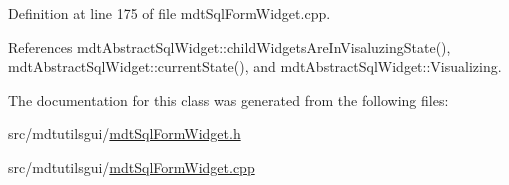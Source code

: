 Definition at line 175 of file mdt\-Sql\-Form\-Widget.\-cpp.



References mdt\-Abstract\-Sql\-Widget\-::child\-Widgets\-Are\-In\-Visaluzing\-State(), mdt\-Abstract\-Sql\-Widget\-::current\-State(), and mdt\-Abstract\-Sql\-Widget\-::\-Visualizing.



The documentation for this class was generated from the following files\-:\begin{DoxyCompactItemize}
\item 
src/mdtutilsgui/\hyperlink{mdt_sql_form_widget_8h}{mdt\-Sql\-Form\-Widget.\-h}\item 
src/mdtutilsgui/\hyperlink{mdt_sql_form_widget_8cpp}{mdt\-Sql\-Form\-Widget.\-cpp}\end{DoxyCompactItemize}
